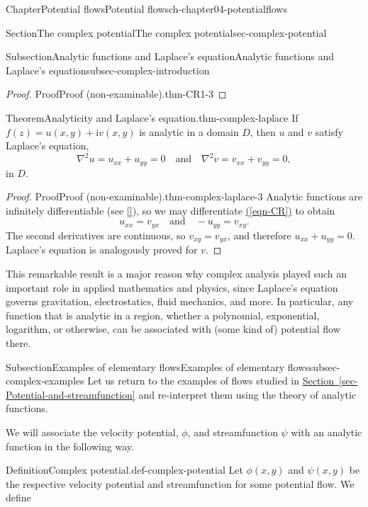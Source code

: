 \documentclass[oneside,10pt,]{book}
\newcommand{\xreffont}{\relax}
\numberwithin{equation}{section}
\newcommand{\im}{\mathrm{i}}
\begin{document}
\begin{chapterptx}{Chapter}{Potential flows}{}{Potential flows}{}{}{ch-chapter04-potentialflows}
\begin{sectionptx}{Section}{The complex potential}{}{The complex potential}{}{}{sec-complex-potential}
\begin{subsectionptx}{Subsection}{Analytic functions and Laplace's equation}{}{Analytic functions and Laplace's equation}{}{}{subsec-complex-introduction}
\begin{proof}{Proof}{Proof (non-examinable).}{thm-CR1-3}
\end{proof}
\begin{theorem}{Theorem}{Analyticity and Laplace's equation.}{}{thm-complex-laplace}%
If \(f(z) = u(x, y) + \im v(x, y)\) is analytic in a domain \(D\), then \(u\) and \(v\) satisfy Laplace's equation,%
\begin{equation*}
\nabla^2 u = u_{xx} + u_{yy} = 0 \quad \textrm{and} \quad
\nabla^2 v = v_{xx} + v_{yy} = 0,
\end{equation*}
in \(D\).%
\end{theorem}
\begin{proof}{Proof}{Proof (non-examinable).}{thm-complex-laplace-3}
Analytic functions are infinitely differentiable (see \hyperlink{ref-kreyszig}{[{\xreffont 2}]}), so we may differentiate \hyperref[eqn-CR]{({\xreffont\ref{eqn-CR}})} to obtain%
\begin{equation*}
u_{xx} = v_{yx} \quad \text{and} \quad -u_{yy} = v_{xy}. 
\end{equation*}
The second derivatives are continuous, so \(v_{xy} = v_{yx}\), and therefore \(u_{xx} + u_{yy} = 0\). Laplace's equation is analogously proved for \(v\).%
\end{proof}
This remarkable result is a major reason why complex analysis played such an important role in applied mathematics and physics, since Laplace's equation governs gravitation, electrostatics, fluid mechanics, and more. In particular, any function that is analytic in a region, whether a polynomial, exponential, logarithm, or otherwise, can be associated with (some kind of) potential flow there.%
\end{subsectionptx}
%
%
\typeout{************************************************}
\typeout{************************************************}
%
\begin{subsectionptx}{Subsection}{Examples of elementary flows}{}{Examples of elementary flows}{}{}{subsec-complex-examples}
Let us return to the examples of flows studied in \hyperref[sec-Potential-and-streamfunction]{Section~{\xreffont\ref{sec-Potential-and-streamfunction}}} and re-interpret them using the theory of analytic functions.%
\par
We will associate the velocity potential, \(\phi\), and streamfunction \(\psi\) with an analytic function in the following way.%
\begin{definition}{Definition}{Complex potential.}{}{def-complex-potential}%
Let \(\phi(x,y)\) and \(\psi(x, y)\) be the respective velocity potential and streamfunction for some potential flow. We define%

\end{definition}
\end{subsectionptx}
\end{sectionptx}
\end{chapterptx}
\end{document}
